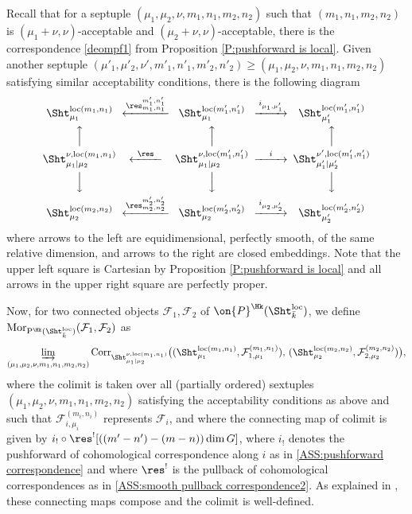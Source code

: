 \documentclass[11pt]{amsart}
\theoremstyle{definition}
\theoremstyle{definition}
\theoremstyle{definition}
\numberwithin{equation}{subsection}
\def\calF{\mathcal{F}}
\newcommand{\mF}{{\mathcal F}}
\newcommand{\loc}{\mathrm{loc}}
\newcommand{\rmP}{\mathrm{P}}
\begin{document}
Recall that for a septuple $(\mu_1,\mu_2,\nu,m_1,n_1,m_2,n_2)$ such that  $(m_1,n_1,m_2,n_2)$ is $(\mu_1+\nu,\nu)$-acceptable and $(\mu_2+\nu,\nu)$-acceptable,
there is the correspondence  \eqref{deompf1} from Proposition \ref{P:pushforward is local}. Given another septuple $(\mu'_1,\mu'_2,\nu',m'_1,n'_1,m'_2,n'_2)\geq (\mu_1,\mu_2,\nu,m_1,n_1,m_2,n_2)$ satisfying similar acceptability conditions, there is the following diagram
\begin{equation*}
\label{E: loc Hecke corr changing level}
\begin{CD}
\Sht_{\mu_1}^{\loc(m_1,n_1)}@<\res^{m'_1,n'_1}_{m_1,n_1}<< \Sht_{\mu_1}^{\loc(m'_1,n'_1)}@>i_{\mu_1,\mu'_1}>> \Sht_{\mu'_1}^{\loc(m'_1,n'_1)}\\
@AAA@AAA@AAA\\
\Sht_{\mu_1\mid\mu_2}^{\nu,\loc(m_1,n_1)}@<\res<<\Sht_{\mu_1\mid\mu_2}^{\nu,\loc(m'_1,n'_1)}@>i>>\Sht_{\mu'_1\mid\mu'_2}^{\nu',\loc(m'_1,n'_1)}\\
@VVV@VVV@VVV\\
\Sht_{\mu_2}^{\loc(m_2,n_2)}@<\res^{m'_2,n'_2}_{m_2,n_2}<<\Sht_{\mu_2}^{\loc(m'_2,n'_2)}@>i_{\mu_2,\mu'_2}>>\Sht_{\mu'_2}^{\loc(m'_2,n'_2)}
\end{CD}
\end{equation*}
where arrows to the left are equidimensional, perfectly smooth, of the same relative dimension, and arrows to the right are closed embeddings. Note that the upper left square is Cartesian by Proposition \ref{P:pushforward is local} and all arrows in the upper right square are perfectly proper.

Now, for two connected objects $\mF_1,\mF_2$ of $\on{P}^\Hk(\Sht^\loc_{\bar k})$, we define $\mathrm{Mor}_{\rmP^\Hk(\Sht^\loc_{\bar k})} (\calF_1, \calF_2)$ as
\begin{equation*}
\label{E: hom space of PcorrSht}
\varinjlim_{(\mu_1,\mu_2,\nu,m_1,n_1,m_2,n_2)} \mathrm{Corr}_{\Sht_{\mu_1|\mu_2}^{\nu, \loc(m_1,n_1)}} \big( (\Sht_{\mu_1}^{\loc(m_1,n_1)}, \calF_{1,\mu_1}^{(m_1,n_1)}),\,( \Sht_{\mu_2}^{\loc(m_2,n_2)},\calF_{2,\mu_2}^{(m_2,n_2)}) \big),
\end{equation*}
where the colimit is taken over all (partially ordered) sextuples $(\mu_1,\mu_2,\nu,m_1,n_1,m_2,n_2)$ satisfying the acceptability conditions as above and such that $\mF_{i,\mu_i}^{(m_i,n_i)}$ represents $\mF_i$, and where the connecting map of colimit is given by $i_!\circ\res^![((m'-n')-(m-n))\dim G]$, where $i_!$ denotes the pushforward of cohomological correspondence along $i$ as in \eqref{ASS:pushforward correspondence} and where $\res^!$ is the pullback of cohomological correspondences as in \eqref{ASS:smooth pullback correspondence2}. As explained in \cite[\S 5.4.1]{XZ}, these connecting maps compose and the colimit is well-defined.
\end{document}
